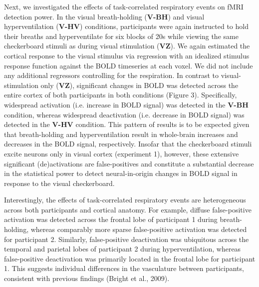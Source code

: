 \documentclass[9pt]{NEU502b-fmri}
\begin{document}
Next, we investigated the effects of task-correlated respiratory events on fMRI detection power. In the visual breath-holding (\textbf{V-BH}) and visual hyperventilation (\textbf{V-HV}) conditions, participants were again instructed to hold their breaths and hyperventilate for six blocks of 20s while viewing the same checkerboard stimuli as during visual stimulation (\textbf{VZ}). We again estimated the cortical response to the visual stimulus via regression with an idealized stimulus response function against the BOLD timeseries at each voxel. We did not include any additional regressors controlling for the respiration. In contrast to visual-stimulation only (\textbf{VZ}), significant changes in BOLD was detected across the entire cortex of both participants in both conditions (Figure 3). Specifically, widespread activation (i.e. increase in BOLD signal) was detected in the \textbf{V-BH} condition, whereas widespread deactivation (i.e. decrease in BOLD signal) was detected in the \textbf{V-HV} condition. This pattern of results is to be expected given that breath-holding and hyperventilation result in whole-brain increases and decreases in the BOLD signal, respectively. Insofar that the checkerboard stimuli excite neurons only in visual cortex (experiment 1), however, these extensive significant (de)activations are false-positives and constitute a substantial decrease in the statistical power to detect neural-in-origin changes in BOLD signal in response to the visual checkerboard. 

Interestingly, the effects of task-correlated respiratory events are heterogeneous across both participants and cortical anatomy. For example, diffuse false-positive activation was detected across the frontal lobe of participant 1 during breath-holding, whereas comparably more sparse  false-positive activation was detected for participant 2. Similarly, false-positive deactivation was ubiquitous across the temporal and parietal lobes of participant 2 during hyperventilation, whereas false-positive deactivation was primarily located in the frontal lobe for participant 1. This suggests individual differences in the vasculature between participants, consistent with previous findings (Bright et al., 2009). 
\end{document}
